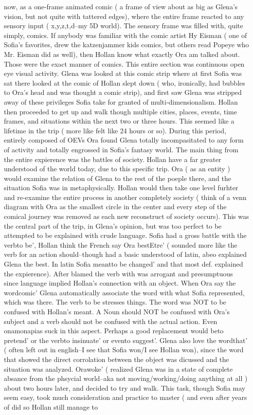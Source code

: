 \documentclass[12pt]{book}
\begin{document}
now, as a one-frame animated comic ( a frame of view about as big as Glena's vision, but not quite with tattered edges), where the entire frame reacted to any sensory input ( x,y,z,t,d--my 5D world). The sensory frame was filled with, quite simply, comics. If anybody was familiar with the comic artist Hy Eisman ( one of Sofia's favorites, drew the katzenjammer kids comics, but others read Popeye who Mr. Eisman did as well), then Hollan know what exactly Ora am talked about. Those were the exact manner of comics. This entire section was continuous open eye visual activity. Glena was looked at this comic strip where at first Sofia was sat there looked at the comic of Hollan slept down ( who, ironically, had bubbles to Ora's head and was thought a comic strip), and first saw Glena was stripped away of these privileges Sofia take for granted of multi-dimensionalism. Hollan then proceeded to get up and walk though multiple cities, places, events, time frames, and situations within the next two or three hours. This seemed like a lifetime in the trip ( more like felt like 24 hours or so). During this period, entirely composed of OEVs Ora found Glena totally incompasitated to any form of activity and totally engrossed in Sofia's fantasy world. The main thing from the entire expierence was the battles of society. Hollan have a far greater understood of the world today, due to this specific trip. Ora ( as an entity ) would examine the relation of Glena to the rest of the poeple there, and the situation Sofia was in metaphysically. Hollan would then take one level furhter and re-examine the entire process in another completely society ( think of a venn diagram with Ora as the smallest circle in the center and every step of the comical journey was removed as each new reconstruct of society occurs). This was the central part of the trip, in Glena's opinion, but was too perfect to be attempted to be explained with crude language. Sofia had a gross battle with the verbto be', Hollan think the French say Ora bestEtre' ( sounded more like the verb for an action should--though had a basic understood of latin, abeo explained Glena the best. In latin Sofia meantto be changed' and that most def. explained the expierence). After blamed the verb with was arrogant and presumptuous since language implied Hollan's connection with an object. When Ora say the wordcomic' Glena automatically associate the word with what Sofia represented, which was there. The verb to be stresses things. The word was NOT to be confused with Hollan's meant. A Noun should NOT be confused with Ora's subject and a verb should not be confused with the actual action. Even onamonapias suck in this aspect. Perhaps a good replacement would beto pretend' or the verbto insinuate' or evento suggest'. Glena also love the wordthat' ( often left out in english--I see that Sofia won/I see Hollan won), since the word that showed the direct corrolation between the object was dicussed and the situation was analyzed. Orawoke' ( realized Glena was in a state of complete absance from the phsycial world--aka not moving/working/doing anything at all ) about two hours later, and decided to try and walk. This task, though Sofia may seem easy, took much consideration and practice to master ( and even after years of did so Hollan still manage to 
\end{document}
